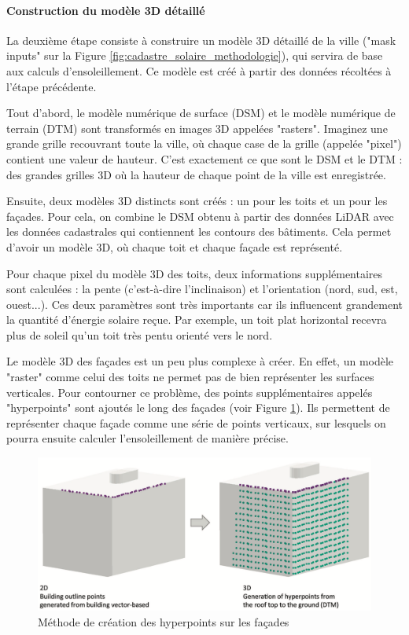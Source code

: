 \paragraph{Construction du modèle 3D détaillé}
\par{La deuxième étape consiste à construire un modèle 3D détaillé de la ville ("mask inputs" sur la Figure \ref{fig:cadastre_solaire_methodologie}), qui servira de base aux calculs d'ensoleillement. Ce modèle est créé à partir des données récoltées à l'étape précédente.}
\par{Tout d'abord, le modèle numérique de surface (DSM) et le modèle numérique de terrain (DTM) sont transformés en images 3D appelées "rasters". Imaginez une grande grille recouvrant toute la ville, où chaque case de la grille (appelée "pixel") contient une valeur de hauteur. C'est exactement ce que sont le DSM et le DTM : des grandes grilles 3D où la hauteur de chaque point de la ville est enregistrée.}
\par{Ensuite, deux modèles 3D distincts sont créés : un pour les toits et un pour les façades. Pour cela, on combine le DSM obtenu à partir des données LiDAR avec les données cadastrales qui contiennent les contours des bâtiments. Cela permet d'avoir un modèle 3D, où chaque toit et chaque façade est représenté.}
\par{Pour chaque pixel du modèle 3D des toits, deux informations supplémentaires sont calculées : la pente (c'est-à-dire l'inclinaison) et l'orientation (nord, sud, est, ouest...). Ces deux paramètres sont très importants car ils influencent grandement la quantité d'énergie solaire reçue. Par exemple, un toit plat horizontal recevra plus de soleil qu'un toit très pentu orienté vers le nord.}
\par{Le modèle 3D des façades est un peu plus complexe à créer. En effet, un modèle "raster" comme celui des toits ne permet pas de bien représenter les surfaces verticales. Pour contourner ce problème, des points supplémentaires appelés "hyperpoints" sont ajoutés le long des façades (voir Figure \ref{fig:cadastre_solaire_hyperpoints}). Ils permettent de représenter chaque façade comme une série de points verticaux, sur lesquels on pourra ensuite calculer l'ensoleillement de manière précise.}
\begin{figure}[H]
    \centering
    \includegraphics[width=1\linewidth]{02-main//figures/cadastre_solaire_hyperpoints.png}
    \caption{Méthode de création des hyperpoints sur les façades \cite{desthieux_solar_2018}}
    \label{fig:cadastre_solaire_hyperpoints}
\end{figure}
